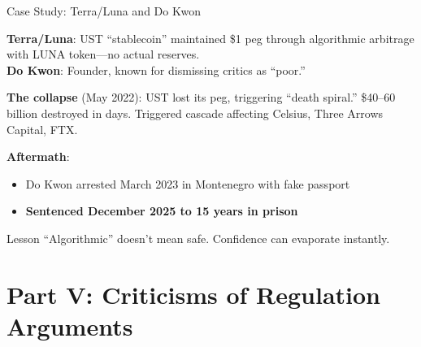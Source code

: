 ﻿\documentclass[aspectratio=169,11pt]{beamer}
\begin{document}
\begin{frame}{Case Study: Terra/Luna and Do Kwon}
\begin{casestudybox}
\small
\textbf{Terra/Luna}: UST ``stablecoin'' maintained \$1 peg through algorithmic arbitrage with LUNA token---no actual reserves.\\
\textbf{Do Kwon}: Founder, known for dismissing critics as ``poor.''
\end{casestudybox}

\vspace{0.2em}
{\small \textbf{The collapse} (May 2022): UST lost its peg, triggering ``death spiral.'' \$40--60 billion destroyed in days. Triggered cascade affecting Celsius, Three Arrows Capital, FTX.}

\textbf{Aftermath}:
\begin{itemize}
    \item Do Kwon arrested March 2023 in Montenegro with fake passport
    \item \textbf{Sentenced December 2025 to 15 years in prison}
\end{itemize}

\begin{alertblock}{Lesson}
``Algorithmic'' doesn't mean safe. Confidence can evaporate instantly.
\end{alertblock}
\end{frame}

\section{Part V: Criticisms of Regulation Arguments}
\end{document}
